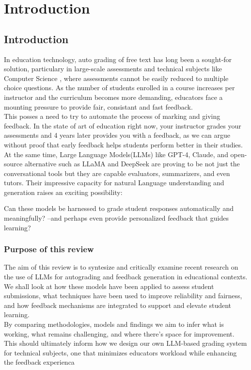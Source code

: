 \documentclass[a4paper,twoside,12pt]{report}
\begin{document}
\chapter{Introduction}
\section{Introduction}
  In education technology, auto grading of free text has long been a sought-for solution,
  particulary in large-scale assessments and technical subjects like Computer Science , where
  assessments cannot be easily reduced to multiple choice questions. As the number of students enrolled in 
  a course increases per instructor and the curriculum becomes more demanding, educators face a mounting pressure
  to provide fair, consistant and fast feedback.\\

  This posses a need to try to automate the process of marking and giving feedback. In the
  state of art of education right now, your instructor grades your assessments and 4 years later 
  provides you with a feedback, as we can argue without proof that early feedback helps students 
  perform better in their studies. \\

At the same time, Large Language Models(LLMs) like GPT-4, Claude, and open-source alternative
such as LLaMA and DeepSeek are proving to be not just the conversational tools but
they are capable evaluators, summarizers, and even tutors. Their impressive capacity
for natural Language understanding and generation raises an exciting possibility:

Can these models be harnessed to grade student responses automatically and meaningfully?
--and perhaps even provide personalized feedback that guides learning?


\subsection{Purpose of this review}
The aim of this review is to syntesize and critically examine recent research
on the use of LLMs for autograding and feedback generation in educational contexts.
We shall look at how these models have been applied to assess student submissions,
what techniques have been used to improve reliability and fairness, and how feedback
mechanisms are integrated to support and elevate student learning.\\
By comparing methodologies, models and findings we aim to infer what is 
working, what remains challenging, and where there's space for improvement.
This should ultimately inform how we design our own LLM-based grading system 
for technical subjects, one that minimizes educators workload while enhancing the feedback experienca 
\end{document}
